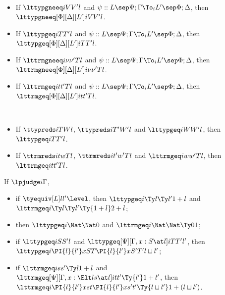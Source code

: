 \begin{law}[Weakening] $ $
  \begin{itemize}
  \item If $\lttypgneeq i V {V'} l$ and
    $\psi :: L \sep \Psi; \Gamma \To_i L' \sep \Phi;\Delta$, then
    $\lttypgneeq[\Phi][\Delta][L'] i{V}{V'}{l}$.
  \item If $\lttypgeq i T{T'} l$ and
    $\psi :: L \sep \Psi; \Gamma \To_i L' \sep \Phi;\Delta$, then
    $\lttypgeq[\Phi][\Delta][L'] i{T}{T'}{l}$.
  \item If $\lttrmgneeq i \nu {\nu'} T l$ and
    $\psi :: L \sep \Psi; \Gamma \To_i L' \sep \Phi;\Delta$, then
    $\lttrmgneeq[\Phi][\Delta][L'] i{\nu}{\nu'}{T}{l}$.
  \item If $\lttrmgeq i t {t'} T l$ and
    $\psi :: L \sep \Psi; \Gamma \To_i L' \sep \Phi;\Delta$, then
    $\lttrmgeq[\Phi][\Delta][L'] i{t}{t'}{T}{l}$.
  \end{itemize}  
\end{law}

\begin{law} $ $
  \begin{itemize}
  \item If $\ttypreds i T W l$, $\ttypreds i{T'}{W'} l$ and $\lttypgeq i W{W'} l$, then $\lttypgeq i T{T'} l$. 
  \item If $\ttrmreds i t w T l$, $\ttrmreds i{t'}{w'}T l$ and $\lttrmgeq i w{w'} T l$, then $\lttrmgeq i t{t'} T l$.
  \end{itemize}
\end{law}

\begin{law}
  If $\lpjudge i \Gamma$, 
  \begin{itemize}
  \item if $\tyequiv[L] l{l'}\Level$, then $\lttypgeq i{\Ty l}{\Ty l'}{1 + l}$ and
    $\lttrmgeq i{\Ty l}{\Ty l'}{\Ty{1 + l}}{2 + l}$;
  \item then $\lttypgeq i{\Nat}{\Nat}0$ and $\lttrmgeq i{\Nat}{\Nat}{\Ty 0}{1}$;
  \item if $\lttypgeq i S{S'} l$ and
    $\lttypgeq[\Psi][\Gamma, x : S \at l] i T{T'}{l'}$, then \newline
    $\lttypgeq i{\PI{l}{l'}x S T}{\PI{l}{l'}x{S'}{T'}}{l \sqcup l'}$;
  \item if $\lttrmgeq i s{s'}{\Ty l}{1 + l}$ and $\lttrmgeq[\Psi][\Gamma, x : \Elt l s \at l] i
    t{t'}{\Ty{l'}}{1 + l'}$, then \newline
    $\lttrmgeq i{\PI{l}{l'}x s t}{\PI{l}{l'}x{s'}{t'}}{\Ty{l \sqcup
      l'}}{1 + {(l \sqcup l')}}$.
  \end{itemize}
\end{law}

